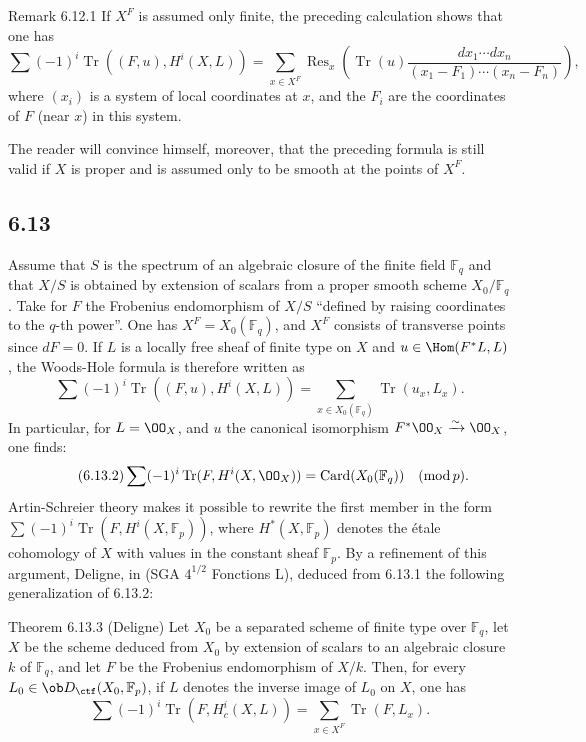 \begin{statement}{Remark 6.12.1}
If $X^F$ is assumed only finite, the preceding calculation shows that one has
\[
\sum(-1)^i\operatorname{Tr}((F,u),H^i(X,L))=
\sum_{x\in X^F}\operatorname{Res}_x\left(\operatorname{Tr}(u)\frac{dx_1\cdots dx_n}{(x_1-F_1)\cdots(x_n-F_n)}\right),
\]
where $(x_i)$ is a system of local coordinates at $x$, and the $F_i$ are the coordinates of $F$ (near $x$) in this system.

The reader will convince himself, moreover, that the preceding formula is still valid if $X$ is proper and is assumed only to be smooth at the points of $X^F$.
\end{statement}

\subsection*{6.13}
Assume that $S$ is the spectrum of an algebraic closure of the finite field $\mathbb F_q$ and that $X/S$ is obtained by extension of scalars from a proper smooth scheme $X_0/\mathbb F_q$. Take for $F$ the Frobenius endomorphism of $X/S$ ``defined by raising coordinates to the $q$-th power''. One has $X^F=X_0(\mathbb F_q)$, and $X^F$ consists of transverse points since $dF=0$. If $L$ is a locally free sheaf of finite type on $X$ and $u\in\Hom(F^*L,L)$, the Woods-Hole formula is therefore written as
\begin{equation}
\tag{6.13.1}
\sum(-1)^i\operatorname{Tr}((F,u),H^i(X,L))=
\sum_{x\in X_0(\mathbb F_q)}\operatorname{Tr}(u_x,L_x).
\end{equation}
In particular, for $L=\OO_X$, and $u$ the canonical isomorphism $F^*\OO_X\xrightarrow{\sim}\OO_X$, one finds:
\begin{equation}
\tag{6.13.2}
\sum(-1)^i\operatorname{Tr}(F,H^i(X,\OO_X))=\operatorname{Card}(X_0(\mathbb F_q))\quad(\operatorname{mod} p).
\end{equation}
Artin-Schreier theory makes it possible to rewrite the first member in the form $\sum(-1)^i\operatorname{Tr}(F,H^i(X,\mathbb F_p))$, where $H^*(X,\mathbb F_p)$ denotes the étale cohomology of $X$ with values in the constant sheaf $\mathbb F_p$. By a refinement of this argument, Deligne, in (SGA $4^{1/2}$ Fonctions L), deduced from 6.13.1 the following generalization of 6.13.2:


\begin{statement}{Theorem 6.13.3 (Deligne)}
Let $X_0$ be a separated scheme of finite type over $\mathbb F_q$, let $X$ be the scheme deduced from $X_0$ by extension of scalars to an algebraic closure $k$ of $\mathbb F_q$, and let $F$ be the Frobenius endomorphism of $X/k$. Then, for every $L_0\in\ob D_{\ctf}(X_0,\mathbb F_p)$, if $L$ denotes the inverse image of $L_0$ on $X$, one has
\[
\sum(-1)^i\operatorname{Tr}(F,H_c^i(X,L))=
\sum_{x\in X^F}\operatorname{Tr}(F,L_x).
\]
\end{statement}

